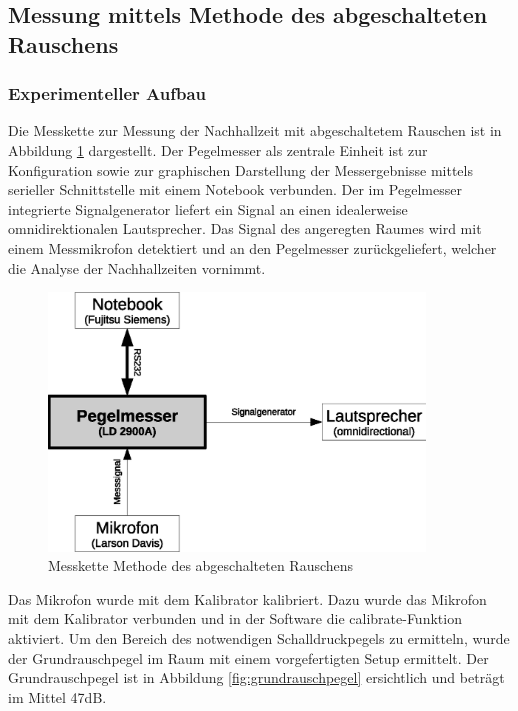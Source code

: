 \documentclass[11pt]{report}
\begin{document}
\subsection{Messung mittels Methode des abgeschalteten Rauschens}

\subsubsection{Experimenteller Aufbau}
Die Messkette zur Messung der Nachhallzeit mit abgeschaltetem Rauschen ist in Abbildung \ref{fig:rauschaufbau} dargestellt. Der Pegelmesser als zentrale Einheit ist zur Konfiguration sowie zur graphischen Darstellung der Messergebnisse mittels serieller Schnittstelle mit einem Notebook verbunden. Der im Pegelmesser integrierte Signalgenerator liefert ein Signal an einen idealerweise omnidirektionalen Lautsprecher. Das Signal des angeregten Raumes wird mit einem Messmikrofon detektiert und an den Pegelmesser zur\"uckgeliefert, welcher die Analyse der Nachhallzeiten vornimmt.
\begin{figure}[htbp]
\begin{center}
\includegraphics[width=10cm,keepaspectratio=true]{rauschaufbau}
\caption{Messkette Methode des abgeschalteten Rauschens}
\label{fig:rauschaufbau}
\end{center}
\end{figure}
Das Mikrofon wurde mit dem Kalibrator kalibriert. Dazu wurde das Mikrofon mit dem Kalibrator verbunden und in der Software die calibrate-Funktion aktiviert. Um den Bereich des notwendigen Schalldruckpegels zu ermitteln, wurde der Grundrauschpegel im Raum mit einem vorgefertigten Setup ermittelt. Der Grundrauschpegel ist in Abbildung \ref{fig:grundrauschpegel} ersichtlich und betr\"agt im Mittel 47dB. 
\end{document}
